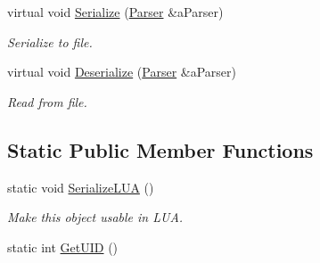 \begin{DoxyCompactItemize}
$$virtual void \hyperlink{classSurface_a4d98b3f6be9a39184f70796b1858c620}{Serialize} (\hyperlink{classParser}{Parser} \&a\+Parser)
\begin{DoxyCompactList}\small\item\em Serialize to file. \end{DoxyCompactList}\item 
virtual void \hyperlink{classSurface_a5afb925d505f53974fd5542698be9407}{Deserialize} (\hyperlink{classParser}{Parser} \&a\+Parser)
\begin{DoxyCompactList}\small\item\em Read from file. \end{DoxyCompactList}\end{DoxyCompactItemize}
\subsection*{Static Public Member Functions}
\begin{DoxyCompactItemize}
\item 
static void \hyperlink{classSurface_ac956ca9cc45b4d2b2c5456529c96d2a4}{Serialize\+L\+UA} ()
\begin{DoxyCompactList}\small\item\em Make this object usable in L\+UA. \end{DoxyCompactList}\item 
static int \hyperlink{classSurface_aba76571de7008e6f3c08177e1d316cc0}{Get\+U\+ID} ()
\end{DoxyCompactItemize}
